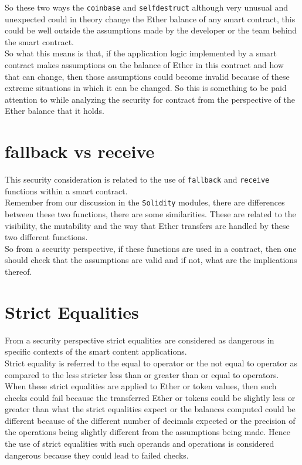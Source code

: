 So these two ways the \texttt{coinbase} and \texttt{selfdestruct} although very unusual and unexpected could in theory change the Ether balance of any smart contract, this could be well outside the assumptions made by the developer or the team behind the smart contract.\\

So what this means is that, if the application logic implemented by a smart contract makes assumptions on the balance of Ether in this contract and how that can change, then those assumptions could become invalid because of these extreme situations in which it can be changed. So this is something to be paid attention to while analyzing the security for contract from the perspective of the Ether balance that it holds.

\section{fallback vs receive}

This security consideration is related to the use of \texttt{fallback} and \texttt{receive} functions within a smart contract. \\

Remember from our discussion in the \texttt{Solidity} modules, there are differences between these two functions, there are some similarities. These are related to the visibility, the mutability and the way that Ether transfers are handled by these two different functions.\\

So from a security perspective, if these functions are used in a contract, then one should check that the assumptions are valid and if not, what are the implications thereof.

\section{Strict Equalities}

From a security perspective strict equalities are considered as dangerous in specific contexts of the smart content applications. \\

Strict equality is referred to the equal to operator or the not equal to operator as compared to the less stricter less than or greater than or equal to operators.\\

When these strict equalities are applied to Ether or token values, then such checks could fail because the transferred Ether or tokens could be slightly less or greater than what the strict equalities expect or the balances computed could be different because of the different number of decimals expected or the precision of the operations being slightly different from the assumptions being made. Hence the use of strict equalities with such operands and operations is considered dangerous because they could lead to failed checks.\\

